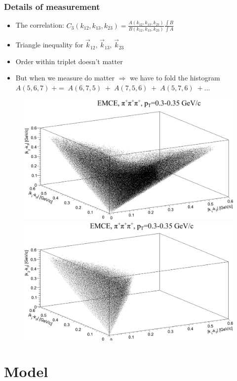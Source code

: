 \documentclass{beamer}
\begin{document}
\begin{frame}
\frametitle{Details of measurement}
\begin{itemize}
\setlength{\itemsep}{10pt}
\item The correlation:
$C_3(k_{12}, k_{13}, k_{23})=\frac{A(k_{12}, k_{13}, k_{23})}{B(k_{12}, k_{13}, k_{23})}\frac{\int B}{\int A}$
\item Triangle inequality for $\vec{k}_{12}$, $\vec{k}_{13}$, $\vec{k}_{23}$
\item Order within triplet doesn't matter
\item But when we measure do matter $\Rightarrow$ we have to fold the histogram
		$A(5,6,7) \;+=\; A(6,7,5)\; + \;A(7,5,6)\; + \;A(5,7,6)\; +...$
\end{itemize}
\begin{figure}
\includegraphics[scale=0.2]{pic/C1}
\includegraphics[scale=0.2]{pic/C2}
\end{figure}
\end{frame}

\section{Model}
\end{document}

